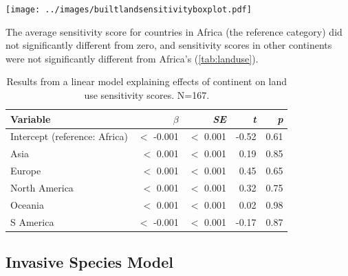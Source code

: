 \documentclass[11pt, a4paper, titlepage]{article}
\begin{document}
	\texttt{[image: ../images/builtlandsensitivityboxplot.pdf]}
    \label{fig:landusebox}
    
    The average sensitivity score for countries in Africa (the reference category) did not significantly different from zero, and sensitivity scores in other continents were not significantly different from Africa's (\autoref{tab:landuse}).
    \begin{table}[h!]
    	\begin{center}
    		\caption{Results from a linear model explaining effects of continent on land use sensitivity scores. \textmd{N=167.}}
    		\label{tab:landuse}
    		\begin{tabular}{l|r|r|r|r} %
    			Variable & $\beta$ & \textit{SE} & \textit{t} & \textit{p}\\
    			\hline
    			Intercept (reference: Africa) & $<$ -0.001 & $<$ 0.001 & -0.52 & 0.61\\
    			Asia & $<$ 0.001 & $<$ 0.001 & 0.19 & 0.85\\
    			Europe & $<$ 0.001 & $<$ 0.001 & 0.45 & 0.65 \\
    			North America & $<$ 0.001 & $<$ 0.001 & 0.32 & 0.75\\
    			Oceania & $<$ 0.001 & $<$ 0.001 & 0.02 & 0.98\\
    			S America & $<$ -0.001 & $<$ 0.001 & -0.17 & 0.87\\
    		\end{tabular}
    	\end{center}
    \end{table}
    
    
	\subsection*{Invasive Species Model}
\end{document}
